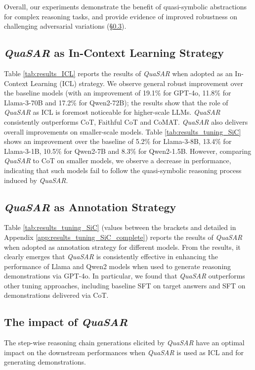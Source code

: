 \documentclass[11pt]{article}
\newcommand{\QuaSAR}{\emph{QuaSAR}\xspace}
\begin{document}
Overall, our experiments demonstrate the benefit of quasi-symbolic abstractions for complex reasoning tasks, and provide evidence of improved robustness on challenging adversarial variations (\S \ref{sec:SiC_impact}). 


\subsection{\QuaSAR as In-Context Learning Strategy}
\label{sec:SiC_in-context}
Table \ref{tab:results_ICL} reports the results of \QuaSAR when adopted as an In-Context Learning (ICL) strategy. We observe general robust improvement over the baseline models (with an improvement of 19.1\% for GPT-4o, 11.8\% for Llama-3-70B and 17.2\% for Qwen2-72B); the results show that the role of \QuaSAR as ICL is foremost noticeable for higher-scale LLMs. \QuaSAR consistently outperforms CoT, Faithful CoT and CoMAT. \QuaSAR also delivers overall improvements on smaller-scale models. Table \ref{tab:results_tuning_SiC} shows an improvement over the baseline of 5.2\% for Llama-3-8B, 13.4\% for Llama-3-1B, 10.5\% for Qwen2-7B and  8.3\% for Qwen2-1.5B. However, comparing \QuaSAR to CoT on smaller models, we observe a decrease in performance, indicating that such models fail to follow the quasi-symbolic reasoning process induced by \QuaSAR. 


\subsection{\QuaSAR as Annotation Strategy}
\label{sec:SiC_as_annotator}

Table \ref{tab:results_tuning_SiC} (values between the brackets and detailed in Appendix \ref{app:results_tuning_SiC_complete}) reports the results of \QuaSAR when adopted as annotation strategy for different models. From the results, it clearly emerges that \QuaSAR is consistently effective in enhancing the performance of Llama and Qwen2 models when used to generate reasoning demonstrations via GPT-4o. In particular, we found that \QuaSAR outperforms other tuning approaches, including baseline SFT on target answers and SFT on demonstrations delivered via CoT. 

\subsection{The impact of \QuaSAR}
\label{sec:SiC_impact}

The step-wise reasoning chain generations elicited by \QuaSAR have an optimal impact on the downstream performances when \QuaSAR is used as ICL and for generating demonstrations. 
\end{document}
